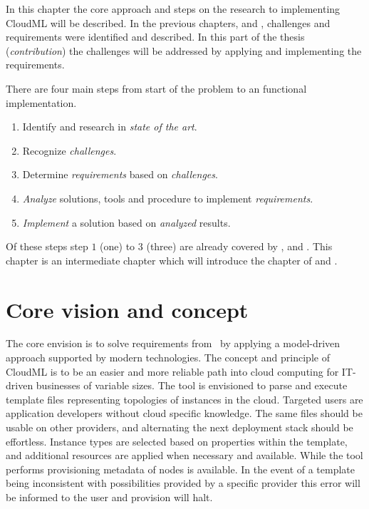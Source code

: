 

In this chapter the core approach and steps on the research to implementing CloudML will be described.
In the previous chapters,  and , 
challenges and requirements were identified and described.
In this part of the thesis (\emph{contribution}) the challenges will be addressed 
by applying and implementing the requirements.

There are four main steps from start of the problem to an functional implementation.
\begin{enumerate}
  \item Identify and research in \emph{state of the art}.
  \item Recognize \emph{challenges}.
  \item Determine \emph{requirements} based on \emph{challenges}.
  \item \emph{Analyze} solutions, tools and procedure to implement \emph{requirements}.
  \item \emph{Implement} a solution based on \emph{analyzed} results.
\end{enumerate}
Of these steps step $1$ (one) to $3$ (three) are already covered by 
,  and .
This chapter is an intermediate chapter which will introduce the chapter of 
and .

\section{Core vision and concept}


The core envision is to solve requirements from~ by applying a 
model-driven approach supported by modern technologies.
The concept and principle of CloudML is to be an easier and more reliable
path into cloud computing for IT-driven businesses of variable sizes.
The tool is envisioned to parse and execute template files representing topologies
of instances in the cloud. 
Targeted users are application developers without cloud specific knowledge. 
The same files should be usable on other providers,
and alternating the next deployment stack should be effortless.
Instance types are selected based on properties within the template,
and additional resources are applied when necessary and available.
While the tool performs provisioning metadata of nodes is available.
In the event of a template being inconsistent with possibilities 
provided by a specific provider this error will be informed 
to the user and provision will halt.

